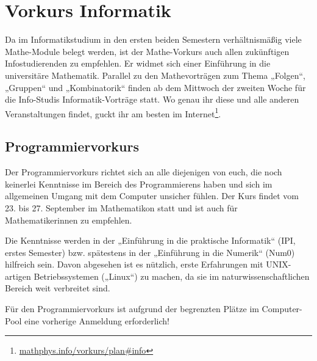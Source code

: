 \section{Vorkurs Informatik}
Da im Informatikstudium in den ersten beiden Semestern verhältnismäßig viele Mathe-Module belegt werden, ist der Mathe-Vorkurs auch allen zukünftigen Infostudierenden zu empfehlen. Er widmet sich einer Einführung in die universitäre Mathematik.
Parallel zu den Mathevorträgen zum Thema „Folgen“, „Gruppen“ und „Kombinatorik“ finden ab dem Mittwoch der zweiten Woche für die Info-Studis Informatik-Vorträge statt. Wo genau ihr diese und alle anderen Veranstaltungen findet, guckt ihr am besten im Internet\footnote{\url{mathphys.info/vorkurs/plan\#info}}.%


\subsection{Programmiervorkurs}
Der Programmiervorkurs richtet sich an alle diejenigen von euch, die noch keinerlei Kenntnisse im Bereich des Programmierens haben und sich im allgemeinen Umgang mit dem Computer unsicher fühlen. Der Kurs findet vom 23. bis 27. September im Mathematikon statt und ist auch für Mathematikerinnen zu empfehlen.

Die Kenntnisse werden in der „Einführung in die praktische Informatik“ (\gls{IPI}, erstes Semester) bzw. spätestens in der „Einführung in die Numerik“ (\gls{Num0}) hilfreich sein. Davon abgesehen ist es nützlich, erste Erfahrungen mit UNIX-artigen Betriebssystemen („Linux“) zu machen, da sie im naturwissenschaftlichen Bereich weit verbreitet sind.

Für den Programmiervorkurs ist aufgrund der begrenzten Plätze im Computer-Pool eine vorherige Anmeldung erforderlich!
